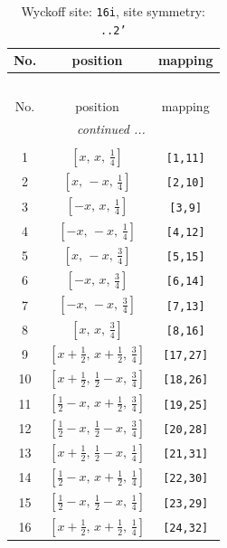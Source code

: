 \documentclass[fleqn,8pt]{jsarticle}
\begin{document}
\begin{longtable}{ccc}
\caption{Wyckoff site: {\tt 16i}, site symmetry: {\tt ..2'}}
 \\
 \hline \hline
No. & position & mapping \\ \hline \endfirsthead

\multicolumn{2}{l}{\tablename\ \thetable{}} \\
 \hline \hline
No. & position & mapping \\ \hline \endhead

 \hline \hline
\multicolumn{2}{r}{\footnotesize\it continued ...} \\ \endfoot

 \hline \hline
\multicolumn{2}{r}{} \\ \endlastfoot

1 & $\left[ x,\, x,\, \frac{1}{4} \right]$ & {\tt [1,11]} \\ \hline
2 & $\left[ x,\, - x,\, \frac{1}{4} \right]$ & {\tt [2,10]} \\ \hline
3 & $\left[ - x,\, x,\, \frac{1}{4} \right]$ & {\tt [3,9]} \\ \hline
4 & $\left[ - x,\, - x,\, \frac{1}{4} \right]$ & {\tt [4,12]} \\ \hline
5 & $\left[ x,\, - x,\, \frac{3}{4} \right]$ & {\tt [5,15]} \\ \hline
6 & $\left[ - x,\, x,\, \frac{3}{4} \right]$ & {\tt [6,14]} \\ \hline
7 & $\left[ - x,\, - x,\, \frac{3}{4} \right]$ & {\tt [7,13]} \\ \hline
8 & $\left[ x,\, x,\, \frac{3}{4} \right]$ & {\tt [8,16]} \\ \hline
9 & $\left[ x + \frac{1}{2},\, x + \frac{1}{2},\, \frac{3}{4} \right]$ & {\tt [17,27]} \\ \hline
10 & $\left[ x + \frac{1}{2},\, \frac{1}{2} - x,\, \frac{3}{4} \right]$ & {\tt [18,26]} \\ \hline
11 & $\left[ \frac{1}{2} - x,\, x + \frac{1}{2},\, \frac{3}{4} \right]$ & {\tt [19,25]} \\ \hline
12 & $\left[ \frac{1}{2} - x,\, \frac{1}{2} - x,\, \frac{3}{4} \right]$ & {\tt [20,28]} \\ \hline
13 & $\left[ x + \frac{1}{2},\, \frac{1}{2} - x,\, \frac{1}{4} \right]$ & {\tt [21,31]} \\ \hline
14 & $\left[ \frac{1}{2} - x,\, x + \frac{1}{2},\, \frac{1}{4} \right]$ & {\tt [22,30]} \\ \hline
15 & $\left[ \frac{1}{2} - x,\, \frac{1}{2} - x,\, \frac{1}{4} \right]$ & {\tt [23,29]} \\ \hline
16 & $\left[ x + \frac{1}{2},\, x + \frac{1}{2},\, \frac{1}{4} \right]$ & {\tt [24,32]} \\
\end{longtable}
\end{document}
